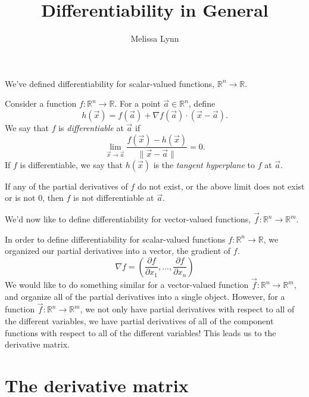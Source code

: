 \documentclass{ximera}
\title{Differentiability in General}
\author{Melissa Lynn}
\begin{document}
\begin{abstract}
\end{abstract}
\maketitle

We've defined differentiability for scalar-valued functions, $\mathbb{R}^n\rightarrow\mathbb{R}$.

\begin{definition}
Consider a function $f:\mathbb{R}^n\rightarrow\mathbb{R}$. For a point $\vec{a}\in\mathbb{R}^n$, define
\[
h(\vec{x}) = f(\vec{a})+\nabla f(\vec{a})\cdot (\vec{x}-\vec{a}).
\]
We say that $f$ is \emph{differentiable} at $\vec{a}$ if
\[
\lim_{\vec{x}\rightarrow \vec{a}}\frac{f(\vec{x}) - h(\vec{x})}{\|\vec{x}-\vec{a}\|} = 0.
\]
If $f$ is differentiable, we say that $h(\vec{x})$ is the \emph{tangent hyperplane} to $f$ at $\vec{a}$.

If any of the partial derivatives of $f$ do not exist, or the above limit does not exist or is not $0$, then $f$ is not differentiable at $\vec{a}$.
\end{definition}

We'd now like to define differentiability for vector-valued functions, $\vec{f}:\mathbb{R}^n\rightarrow\mathbb{R}^m$.

In order to define differentiability for scalar-valued functions $f:\mathbb{R}^n\rightarrow\mathbb{R}$, we organized our partial derivatives into a vector, the gradient of $f$.
\[
\nabla f = \left(\frac{\partial f}{\partial x_1},...,\frac{\partial f}{\partial x_n}\right)
\]
We would like to do something similar for a vector-valued function $\vec{f}:\mathbb{R}^n\rightarrow\mathbb{R}^m$, and organize all of the partial derivatives into a single object. However, for a function $\vec{f}:\mathbb{R}^n\rightarrow\mathbb{R}^m$, we not only have partial derivatives with respect to all of the different variables, we have partial derivatives of all of the component functions with respect to all of the different variables! This leads us to the derivative matrix.

\section*{The derivative matrix}
\end{document}
